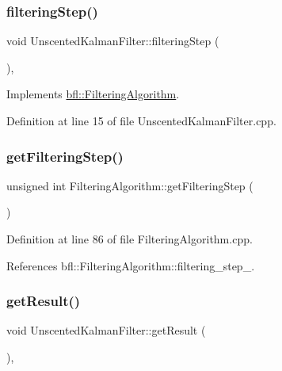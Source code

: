 \subsubsection{\texorpdfstring{filtering\+Step()}{filteringStep()}}
{\footnotesize\ttfamily void Unscented\+Kalman\+Filter\+::filtering\+Step (\begin{DoxyParamCaption}{ }\end{DoxyParamCaption})\hspace{0.3cm}{\ttfamily [override]}, {\ttfamily [virtual]}}



Implements \mbox{\hyperlink{classbfl_1_1FilteringAlgorithm_ab3bceb43b5810a4bf1da884b8a0b145a}{bfl\+::\+Filtering\+Algorithm}}.



Definition at line 15 of file Unscented\+Kalman\+Filter.\+cpp.

\mbox{\label{classbfl_1_1FilteringAlgorithm_a8c43b1f3dac30934c0a03de348d4a29d}} 
\subsubsection{\texorpdfstring{get\+Filtering\+Step()}{getFilteringStep()}}
{\footnotesize\ttfamily unsigned int Filtering\+Algorithm\+::get\+Filtering\+Step (\begin{DoxyParamCaption}{ }\end{DoxyParamCaption})\hspace{0.3cm}{\ttfamily [inherited]}}



Definition at line 86 of file Filtering\+Algorithm.\+cpp.



References bfl\+::\+Filtering\+Algorithm\+::filtering\+\_\+step\+\_\+.

\mbox{\label{classbfl_1_1UnscentedKalmanFilter_ad25c4f9143bbe834b3adfc81c78b6743}} 
\subsubsection{\texorpdfstring{get\+Result()}{getResult()}}
{\footnotesize\ttfamily void Unscented\+Kalman\+Filter\+::get\+Result (\begin{DoxyParamCaption}{ }\end{DoxyParamCaption})\hspace{0.3cm}{\ttfamily [override]}, {\ttfamily [virtual]}}



